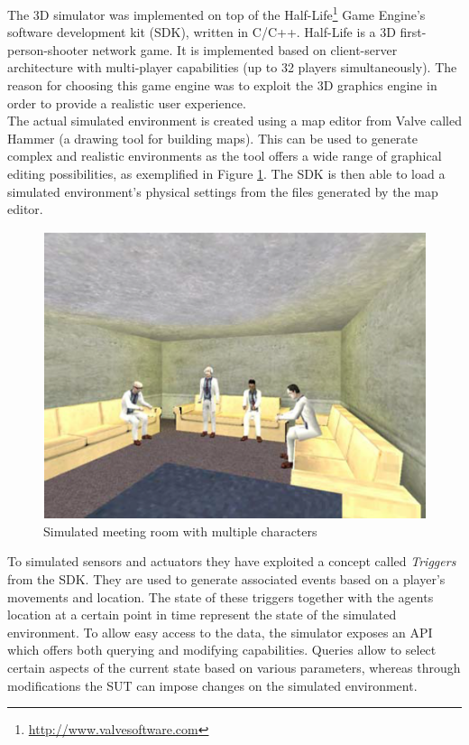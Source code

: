 The 3D simulator was implemented on top of the Half-Life\footnote{\url{http://www.valvesoftware.com}} Game Engine's software development kit (SDK), written in C/C++. Half-Life is a 3D first-person-shooter network game. It is implemented based on client-server architecture with multi-player capabilities (up to 32 players simultaneously). The reason for choosing this game engine was to exploit the 3D graphics engine in order to provide a realistic user experience.\\

The actual simulated environment is created using a map editor from Valve called Hammer (a drawing tool for building maps). This can be used to generate complex and realistic environments as the tool offers a wide range of graphical editing possibilities, as exemplified in Figure \ref{fig:tatus_simulated_meeting_room}. The SDK is then able to load a simulated environment's physical settings from the files generated by the map editor.\\

\begin{figure}[H]
	\centering
	\includegraphics[width=\linewidth]{gfx/Chapter2/tatus_simulated_meeting_room}
	\caption{Simulated meeting room with multiple characters}
	\label{fig:tatus_simulated_meeting_room}
\end{figure}

To simulated sensors and actuators they have exploited a concept called \emph{Triggers} from the SDK. They are used to generate associated events based on a player's movements and location. The state of these triggers together with the agents location at a certain point in time represent the state of the simulated environment. To allow easy access to the data, the simulator exposes an API which offers both querying and modifying capabilities. Queries allow to select certain aspects of the current state based on various parameters, whereas through modifications the SUT can impose changes on the simulated environment.\\

